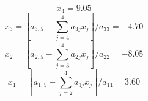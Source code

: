 \begin{solution}
$$ 
 x_{4}=9.05 
 $$ 
$$ 
 x_{3}=\left[a_{3, 5}-\sum_{j=4}^{4} a_{3 j} x_{j}\right] / a_{3 3}=-4.70 
 $$ 
$$ 
 x_{2}=\left[a_{2, 5}-\sum_{j=3}^{4} a_{2 j} x_{j}\right] / a_{2 2}=-8.05 
 $$ 
$$ 
 x_{1}=\left[a_{1, 5}-\sum_{j=2}^{4} a_{1 j} x_{j}\right] / a_{1 1}=3.60 
 $$ 



\end{solution}
